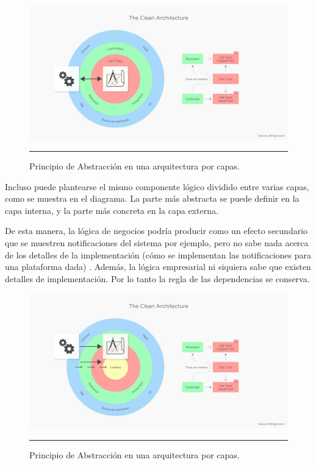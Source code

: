 \begin{figure}[htbp]
	\centering
	\includegraphics[width=1\textwidth]{Figures/-002.png}
	\rule{35em}{1pt}
	\caption[Abstraction Principle]{Principio de Abstracción en una arquitectura por capas.}
	\label{fig:C2_PA}
\end{figure}

Incluso puede plantearse el mismo componente lógico dividido entre varias capas, como se muestra en el diagrama. La parte más abstracta se puede definir en la capa interna, y la parte más concreta en la capa externa.

De esta manera, la lógica de negocios podría producir como un efecto secundario que se muestren notificaciones del sistema por ejemplo, pero no sabe nada acerca de los detalles de la implementación (cómo se implementan las notificaciones para una plataforma dada) . Además, la lógica empresarial ni siquiera sabe que existen detalles de implementación. Por lo tanto la regla de las dependencias se conserva.


\begin{figure}[htbp]
	\centering
	\includegraphics[width=1\textwidth]{Figures/-003.png}
	\rule{35em}{1pt}
	\caption[Abstraction Principle]{Principio de Abstracción en una arquitectura por capas.}
	\label{fig:C2_PA_02}
\end{figure}

